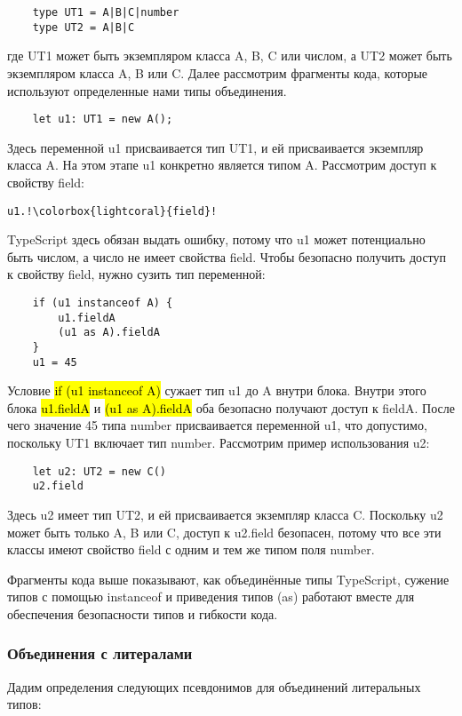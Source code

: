 \begin{lstlisting}
    type UT1 = A|B|C|number
    type UT2 = A|B|C
\end{lstlisting}
где UT1 может быть экземпляром класса A, B, C или числом, а UT2 может быть экземпляром класса A, B или C\@.
Далее рассмотрим фрагменты кода, которые используют определенные нами типы объединения.

\begin{lstlisting}
    let u1: UT1 = new A();
\end{lstlisting}
Здесь переменной u1 присваивается тип UT1, и ей присваивается экземпляр класса A\@.
На этом этапе u1 конкретно является типом A\@.
Рассмотрим доступ к свойству field:
\begin{lstlisting}[escapechar=!]
    u1.!\colorbox{lightcoral}{field}!
\end{lstlisting}
TypeScript здесь обязан выдать ошибку, потому что u1 может потенциально быть числом, а число не имеет свойства field.
Чтобы безопасно получить доступ к свойству field, нужно сузить тип переменной:

\begin{lstlisting}
    if (u1 instanceof A) {
        u1.fieldA
        (u1 as A).fieldA
    }
    u1 = 45
\end{lstlisting}
Условие \hl{if (u1 instanceof A)} сужает тип u1 до A внутри блока.
Внутри этого блока \hl{u1.fieldA} и \hl{(u1 as A).fieldA} оба безопасно получают доступ к fieldA\@.
После чего значение 45 типа number присваивается переменной u1, что допустимо, поскольку UT1 включает тип number.
Рассмотрим пример использования u2:

\begin{lstlisting}
    let u2: UT2 = new C()
    u2.field
\end{lstlisting}
Здесь u2 имеет тип UT2, и ей присваивается экземпляр класса C.
Поскольку u2 может быть только A, B или C, доступ к u2.field безопасен, потому что все эти классы имеют свойство field
с одним и тем же типом поля number.

Фрагменты кода выше показывают, как объединённые типы TypeScript, сужение типов с помощью instanceof и приведения типов
(as) работают вместе для обеспечения безопасности типов и гибкости кода.

\subsubsection{Объединения с литералами}

Дадим определения следующих псевдонимов для объединений литеральных типов:

